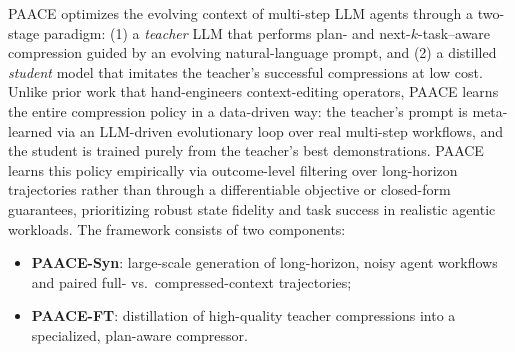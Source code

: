 \documentclass{article}
\theoremstyle{plain}
\theoremstyle{definition}
\theoremstyle{remark}
\begin{document}
PAACE optimizes the evolving context of multi-step LLM agents through a two-stage paradigm:
(1) a \emph{teacher} LLM that performs plan- and next-\(k\)-task--aware compression guided by an
evolving natural-language prompt, and
(2) a distilled \emph{student} model that imitates the teacher's successful compressions at low cost.
Unlike prior work that hand-engineers context-editing operators, PAACE learns the entire
compression policy in a data-driven way: the teacher's prompt is meta-learned via an
LLM-driven evolutionary loop over real multi-step workflows, and the student is trained purely
from the teacher's best demonstrations. PAACE learns this policy empirically via outcome-level filtering
over long-horizon trajectories rather than through a differentiable objective
or closed-form guarantees, prioritizing robust state fidelity and task success
in realistic agentic workloads. The framework consists of two components:
\vspace{-4pt}
\begin{itemize}\setlength{\topsep}{0pt}\setlength{\partopsep}{0pt}\setlength{\itemsep}{0pt}\setlength{\parskip}{0pt}\setlength{\parsep}{0pt}
    \item \textbf{PAACE-Syn}: large-scale generation of long-horizon, noisy agent workflows and paired
    full- vs.\ compressed-context trajectories;
    \item \textbf{PAACE-FT}: distillation of high-quality teacher compressions into a specialized,
    plan-aware compressor.
\end{itemize}
\vspace{-4pt}

\end{document}
